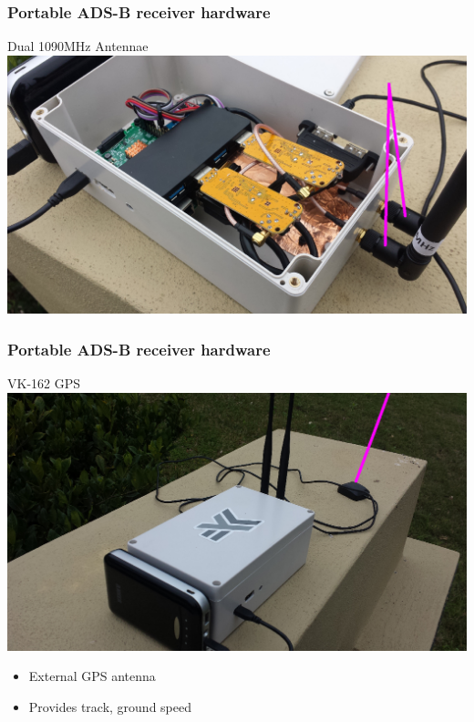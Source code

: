 \begin{frame}
\frametitle{Portable ADS-B receiver hardware}
\begin{block}{Dual 1090MHz Antennae}
\includegraphics[height=0.5\textheight]{image/adsb-hardware-antennae.png}
\end{block}
\end{frame}

\begin{frame}
\frametitle{Portable ADS-B receiver hardware}
\begin{block}{VK-162 GPS}
\includegraphics[height=0.5\textheight]{image/adsb-hardware-vk162.png}
\begin{itemize}
\item External GPS antenna
\item Provides track, ground speed
\end{itemize}
\end{block}
\end{frame}

